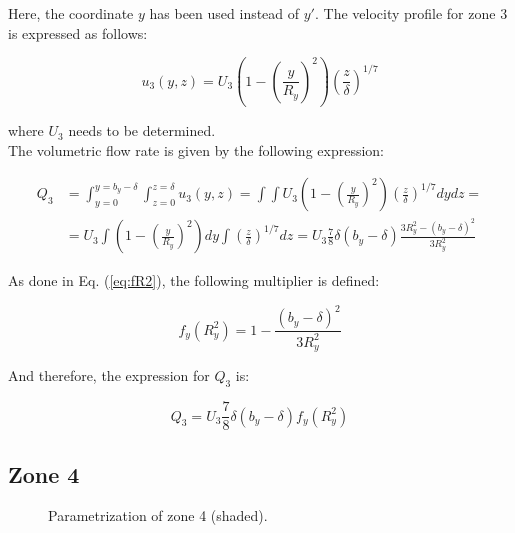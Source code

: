 Here, the coordinate $y$ has been used instead of $y'$. The velocity profile for zone $3$ is expressed as follows:

\begin{equation}
\label{eq:3DBL_profile_u3}
\boxed{
u_3 \left( y, z \right) = U_3 \left( 1 - \left( \frac{y}{R_y} \right)^2 \right) \left( \frac{z}{\delta} \right)^{1/7}
}
\end{equation}

where $U_3$ needs to be determined. \\

The volumetric flow rate is given by the following expression:
 
\begin{equation}
\begin{split}
Q_3 &= \int_{y=0}^{y= b_y - \delta} \int_{z=0}^{z=\delta} u_3 \left( y, z  \right) = \int \int U_3 \left( 1 - \left( \frac{y}{R_y} \right)^2 \right) \left( \frac{z}{\delta} \right)^{1/7} dy dz = \\
&= U_3  \int \left( 1 - \left( \frac{y}{R_y} \right)^2 \right) dy \int \left( \frac{z}{\delta} \right)^{1/7} dz = U_3 \frac{7}{8} \delta \left( b_y - \delta \right) \frac{3 R_y^2 - \left( b_y - \delta \right)^2}{3 R_y^2}
\end{split}
\end{equation}

As done in Eq. (\ref{eq:fR2}), the following multiplier is defined:

\begin{equation}
f_y \left( R_y^2 \right) = 1 - \frac{\left( b_y - \delta \right)^2}{3 R_y^2}
\end{equation}

And therefore, the expression for $Q_3$ is:

\begin{equation}
\label{eq:3DBL_Q3}
\boxed{
Q_3 = U_3 \frac{7}{8} \delta \left( b_y - \delta \right) f_y \left( R_y^2 \right)
}
\end{equation}


\newpage

\subsection{Zone 4}

\begin{figure}[h!]	
	\centering
%	
	\caption{Parametrization of zone 4 (shaded).}
	\label{fig:param_z4}
\end{figure}

